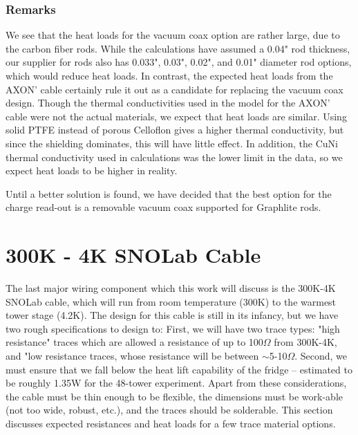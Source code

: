 \documentclass{report}
\begin{document}
\subsubsection{Remarks}
We see that the heat loads for the vacuum coax option are rather large, due to the carbon fiber rods. While the calculations have assumed a 0.04" rod thickness, our supplier \footnotemark for rods also has 0.033", 0.03", 0.02", and 0.01" diameter rod options, which would reduce heat loads. In contrast, the expected heat loads from the AXON' cable certainly rule it out as a candidate for replacing the vacuum coax design. Though the thermal conductivities used in the model for the AXON' cable were not the actual materials, we expect that heat loads are similar. Using solid PTFE instead of porous Celloflon gives a higher thermal conductivity, but since the shielding dominates, this will have little effect. In addition, the CuNi thermal conductivity used in calculations was the lower limit in the data, so we expect heat loads to be higher in reality.

Until a better solution is found, we have decided that the best option for the charge read-out is a removable vacuum coax supported for Graphlite rods.



\section{300K - 4K SNOLab Cable}

The last major wiring component which this work will discuss is the 300K-4K SNOLab cable, which will run from room temperature (300K) to the warmest tower stage (4.2K). The design for this cable is still in its infancy, but we have two rough specifications to design to: First, we will have two trace types: "high resistance" traces which are allowed a resistance of up to 100$\Omega$ from 300K-4K, and "low resistance traces, whose resistance will be between $\sim$5-10$\Omega$\footnotemark . Second, we must ensure that we fall below the heat lift capability of the fridge -- estimated to be roughly 1.35W for the 48-tower experiment. Apart from these considerations, the cable must be thin enough to be flexible, the dimensions must be work-able (not too wide, robust, etc.), and the traces should be solderable. This section discusses expected resistances and heat loads for a few trace material options.
\end{document}
